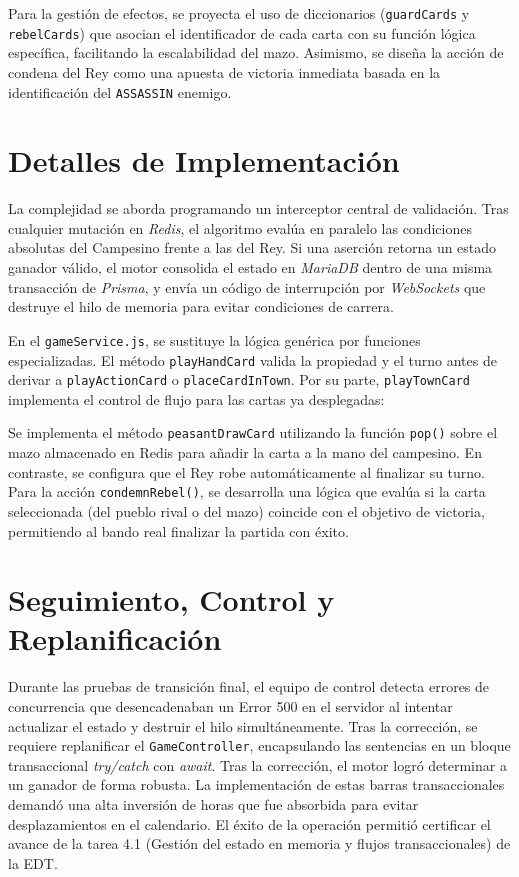 Para la gestión de efectos, se proyecta el uso de diccionarios (\texttt{guardCards} y \texttt{rebelCards}) que asocian el identificador de cada carta con su función lógica específica, facilitando la escalabilidad del mazo. Asimismo, se diseña la acción de condena del Rey como una apuesta de victoria inmediata basada en la identificación del \texttt{ASSASSIN} enemigo.

\section{Detalles de Implementación}
La complejidad se aborda programando un interceptor central de validación. Tras cualquier mutación en \textit{Redis}, el algoritmo evalúa en paralelo las condiciones absolutas del Campesino frente a las del Rey. Si una aserción retorna un estado ganador válido, el motor consolida el estado en \textit{MariaDB} dentro de una misma transacción de \textit{Prisma}, y envía un código de interrupción por \textit{WebSockets} que destruye el hilo de memoria para evitar condiciones de carrera.

En el \texttt{gameService.js}, se sustituye la lógica genérica por funciones especializadas. El método \texttt{playHandCard} valida la propiedad y el turno antes de derivar a \texttt{playActionCard} o \texttt{placeCardInTown}. Por su parte, \texttt{playTownCard} implementa el control de flujo para las cartas ya desplegadas:

Se implementa el método \texttt{peasantDrawCard} utilizando la función \texttt{pop()} sobre el mazo almacenado en Redis para añadir la carta a la mano del campesino. En contraste, se configura que el Rey robe automáticamente al finalizar su turno. Para la acción \texttt{condemnRebel()}, se desarrolla una lógica que evalúa si la carta seleccionada (del pueblo rival o del mazo) coincide con el objetivo de victoria, permitiendo al bando real finalizar la partida con éxito.

\section{Seguimiento, Control y Replanificación}
Durante las pruebas de transición final, el equipo de control detecta errores de concurrencia que desencadenaban un Error 500 en el servidor al intentar actualizar el estado y destruir el hilo simultáneamente. Tras la corrección, se requiere replanificar el \texttt{GameController}, encapsulando las sentencias en un bloque transaccional \textit{try/catch} con \textit{await}. Tras la corrección, el motor logró determinar a un ganador de forma robusta. La implementación de estas barras transaccionales demandó una alta inversión de horas que fue absorbida para evitar desplazamientos en el calendario. El éxito de la operación permitió certificar el avance de la tarea 4.1 (Gestión del estado en memoria y flujos transaccionales) de la EDT.